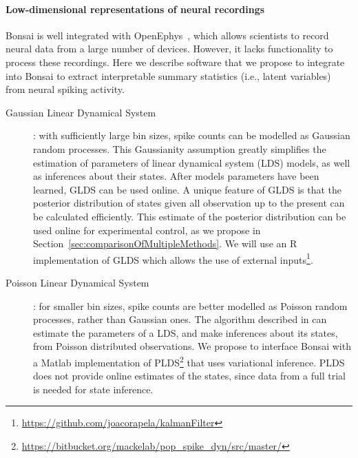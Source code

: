 \paragraph{Low-dimensional representations of neural recordings}
\label{sec:lowDimensionalRepresentation}

Bonsai is well integrated with OpenEphys~\citep{siegleEtAl17}, which allows
scientists to record neural data from a large number of devices. However, it
lacks functionality to process these recordings. Here we describe software that
we propose to integrate into Bonsai to extract interpretable summary statistics
(i.e., latent variables) from neural spiking activity.

\begin{description}

    \item[Gaussian Linear Dynamical
        System]\citep[GLDS;][]{andersonAndMoore12}: with sufficiently large
        bin sizes, spike counts can be modelled as Gaussian random processes.
        This Gaussianity assumption greatly simplifies the estimation of
        parameters of linear dynamical system (LDS) models, as well as
        inferences about their states. After models parameters have been
        learned, GLDS can be used online. A unique feature of GLDS is that the
        posterior distribution of states given all observation up to the
        present can be calculated efficiently. This estimate of the posterior
        distribution can be used online for experimental control, as we
        propose in Section~\ref{sec:comparisonOfMultipleMethods}. We will use an R implementation of GLDS
        which allows the use of external
        inputs\footnote{\href{https://github.com/joacorapela/kalmanFilter}{https://github.com/joacorapela/kalmanFilter}}.

    \item[Poisson Linear Dynamical System]\citep[PLDS;][]{mackeEtAl15}: for
        smaller bin sizes, spike counts are better modelled as Poisson random
        processes, rather than Gaussian ones. The algorithm described in
        \citet{mackeEtAl15} can estimate the parameters of a LDS, and make
        inferences about its states, from Poisson distributed observations.  We
        propose to interface Bonsai with a Matlab implementation of
        PLDS\footnote{\href{https://bitbucket.org/mackelab/pop\_spike\_dyn/src/master/}{https://bitbucket.org/mackelab/pop\_spike\_dyn/src/master/}}
        that uses variational inference. PLDS does not provide online estimates
        of the states, since data from a full trial is needed for state
        inference.


\end{description}
